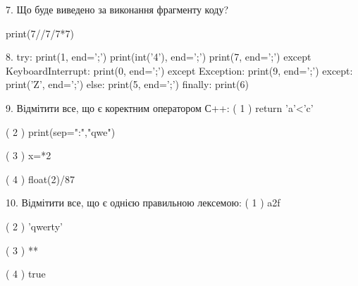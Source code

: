 \documentclass[11pt]{article}
\begin{document}
7. Що буде виведено за виконання фрагменту коду?

print(7//7/7*7)
\vspace{5mm}

8. 
try:
    print(1, end=';')
    print(int('4'), end=';')
    print(7, end=';')
except KeyboardInterrupt:
    print(0, end=';')
except Exception:
    print(9, end=';')
except:
    print('Z', end=';')
else:
    print(5, end=';')
finally:
    print(6)
\vspace{5mm}

9. %
Відмітити все, що є коректним оператором С++:
( 1 ) return 'a'<'c'

( 2 ) print(sep=":","qwe")

( 3 ) x=*2

( 4 ) float(2)/87
\vspace{5mm}

10. %
Відмітити все, що є однією правильною лексемою:
( 1 ) a2f

( 2 ) 'qwerty'

( 3 ) **

( 4 ) true
\vspace{5mm}

\newpage
\end{document}

